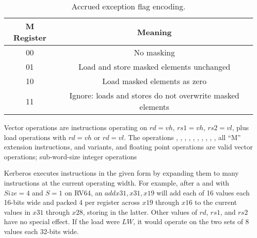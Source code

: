 \begin{table}[htp]
    \begin{small}
        \begin{center}
            \begin{tabular}{cl}
                \hline
                \multicolumn{1}{|c|}{M Register} &
                \multicolumn{1}{c|}{Meaning} \\
                \hline
                \multicolumn{1}{|c|}{00} &
                \multicolumn{1}{c|}{No masking}\\
                \hline
                \multicolumn{1}{|c|}{01} &
                \multicolumn{1}{c|}{Load and store masked elements unchanged}\\
                \hline
                \multicolumn{1}{|c|}{10} &
                \multicolumn{1}{c|}{Load masked elements as zero}\\
                \hline
                \multicolumn{1}{|c|}{11} &
                \multicolumn{1}{c|}{Ignore:  loads and stores do not overwrite masked elements}\\
                \hline
            \end{tabular}
        \end{center}
    \end{small}
    \caption{Accrued exception flag encoding.}
    \label{bitdef}
\end{table}

Vector operations are instructions operating on $rd=vh$, $rs1=vh$, $rs2=vl$,
plus load operations with $rd=vh$ or $rd=vl$.  The operations ,
, , , ,
, , , ,
, all ``M'' extension instructions,  and
 variants, and floating point operations are valid vector
operations; sub-word-size integer operations

Kerberos executes instructions in the given form by expanding them to many
instructions at the current operating width.  For example, after a
 and with $Size=4$ and $S=1$ on RV64, an $add
x31, x31, x19$ will add each of 16 values each 16-bits wide and packed 4 per
register across $x19$ through $x16$ to the current values in $x31$ through
$x28$, storing in the latter.  Other values of $rd$, $rs1$, and $rs2$ have no
special effect.  If the load were $LW$, it would operate on the two sets of 8
values each 32-bits wide.


